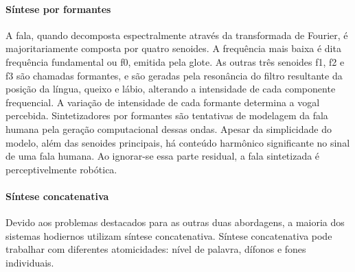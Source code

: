 \paragraph{Síntese por formantes}
A fala, quando decomposta espectralmente através da transformada de Fourier, é
majoritariamente composta por quatro senoides. A frequência mais baixa é dita
frequência fundamental ou f0, emitida pela glote. As outras três senoides f1, f2
e f3 são chamadas formantes, e são geradas pela resonância do filtro resultante
da posição da língua, queixo e lábio, alterando a intensidade de cada componente
frequencial. A variação de intensidade de cada formante determina a vogal
percebida. Sintetizadores por formantes são tentativas de modelagem da fala
humana pela geração computacional dessas ondas. Apesar da simplicidade do
modelo, além das senoides principais, há conteúdo harmônico significante no
sinal de uma fala humana. Ao ignorar-se essa parte residual, a fala sintetizada
é perceptivelmente robótica.


\paragraph{Síntese concatenativa}
Devido aos problemas destacados para as outras duas abordagens, a maioria dos
sistemas hodiernos utilizam síntese concatenativa.
Síntese concatenativa pode trabalhar com diferentes atomicidades: nível de palavra,
dífonos e fones individuais.



